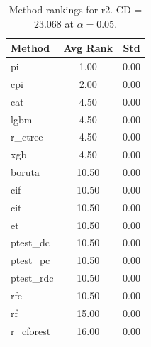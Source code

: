 \begin{table}[h]
\centering
\caption{Method rankings for r2. CD = 23.068 at $\alpha=0.05$.}
\label{tab:ranks_r2}
\begin{tabular}{lcc}
\toprule
Method & Avg Rank & Std \\
\midrule
pi & 1.00 & 0.00 \\
cpi & 2.00 & 0.00 \\
cat & 4.50 & 0.00 \\
lgbm & 4.50 & 0.00 \\
r_ctree & 4.50 & 0.00 \\
xgb & 4.50 & 0.00 \\
boruta & 10.50 & 0.00 \\
cif & 10.50 & 0.00 \\
cit & 10.50 & 0.00 \\
et & 10.50 & 0.00 \\
ptest_dc & 10.50 & 0.00 \\
ptest_pc & 10.50 & 0.00 \\
ptest_rdc & 10.50 & 0.00 \\
rfe & 10.50 & 0.00 \\
rf & 15.00 & 0.00 \\
r_cforest & 16.00 & 0.00 \\
\bottomrule
\end{tabular}
\end{table}